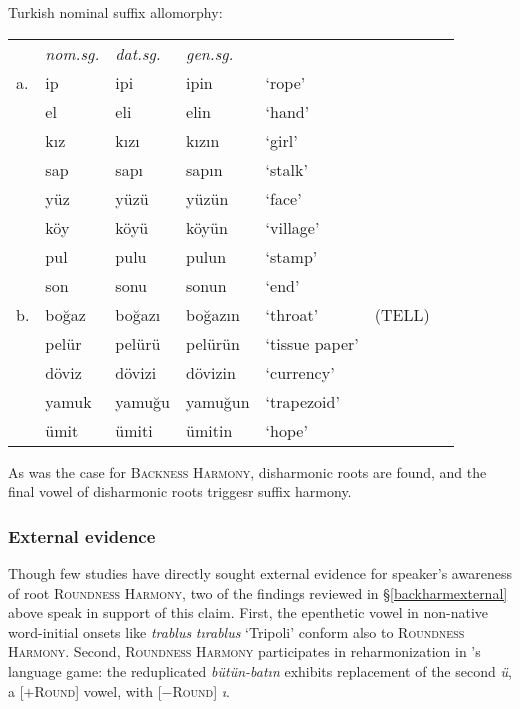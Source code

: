 \begin{example}
Turkish nominal suffix allomorphy: 

\begin{tabular}{l l l l l l l}
   & \emph{nom.sg.} & \emph{dat.sg.} & \emph{gen.sg.}  \\
a. & ip             & ipi            & ipin           & `rope' & \citep[][216]{Clements1982} \\
   & el             & eli            & elin           & `hand'    \\
   & kız            & kızı           & kızın          & `girl'    \\
   & sap            & sapı           & sapın          & `stalk'   \\
   & yüz            & yüzü           & yüzün          & `face'    \\
   & köy            & köyü           & köyün          & `village' \\
   & pul            & pulu           & pulun          & `stamp'   \\
   & son            & sonu           & sonun          & `end'     \\
b. & boğaz          & boğazı         & boğazın        & `throat'  & (TELL) \\
   & pelür          & pelürü         & pelürün        & `tissue paper' \\
   & döviz          & dövizi         & dövizin        & `currency' \\
   & yamuk          & yamuğu         & yamuğun        & `trapezoid' \\
   & ümit           & ümiti          & ümitin         & `hope'     \\
\end{tabular}
\end{example}

\noindent As was the case for \textsc{Backness Harmony}, disharmonic roots are found, and the final vowel of disharmonic roots triggesr suffix harmony.

\subsubsection{External evidence}

Though few studies have directly sought external evidence for speaker's awareness of root \textsc{Roundness Harmony}, two of the findings reviewed in \S\ref{backharmexternal} above speak in support of this claim. First, the epenthetic vowel in non-native word-initial onsets
like \emph{trablus} \alt{} \emph{tırablus} `Tripoli' conform also to \textsc{Roundness Harmony}.
Second, \textsc{Roundness Harmony} participates in reharmonization in \citeauthor{Harrison2001}'s language game: the reduplicated \emph{bütün-batın} exhibits replacement of the second \emph{ü}, a [$+$\textsc{Round}] vowel, with [$-$\textsc{Round}] \emph{ı}.

